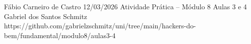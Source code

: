 \documentclass{article}
\begin{document}
{Fábio Carneiro de Castro}
{12/03/2026}
{Atividade Prática -- Módulo 8}
{Aulas 3 e 4}
{Gabriel dos Santos Schmitz}
{https://github.com/gabrielzschmitz/uni/tree/main/hackers-do-bem/fundamental/modulo8/aulas3-4}




\newpage
\printbibliography[title=Referências]
\end{document}
